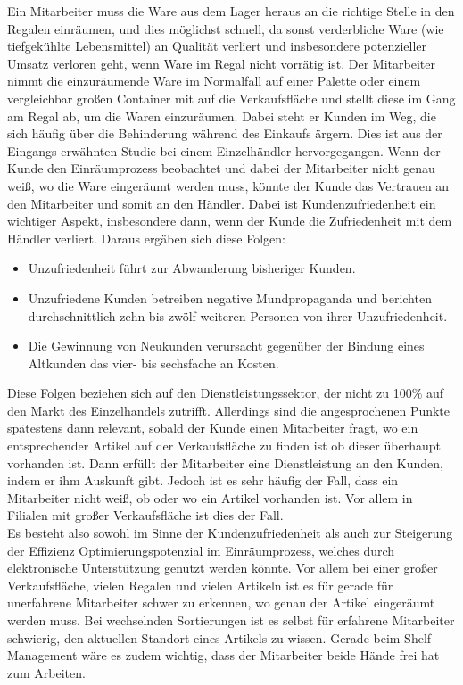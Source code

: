 Ein Mitarbeiter muss die Ware aus dem Lager heraus an die richtige Stelle in den Regalen einräumen, und dies möglichst schnell, da sonst verderbliche Ware (wie \zB tiefgekühlte Lebensmittel) an Qualität verliert und insbesondere potenzieller Umsatz verloren geht, wenn Ware im Regal nicht vorrätig ist. Der Mitarbeiter nimmt die einzuräumende Ware im Normalfall auf einer Palette oder einem vergleichbar großen Container mit auf die Verkaufsfläche und stellt diese im Gang am Regal ab, um die Waren einzuräumen. Dabei steht er Kunden im Weg, die sich häufig über die Behinderung während des Einkaufs ärgern. Dies ist aus der Eingangs erwähnten Studie bei einem Einzelhändler hervorgegangen. Wenn der Kunde den Einräumprozess beobachtet und dabei der Mitarbeiter nicht genau weiß, wo die Ware eingeräumt werden muss, könnte der Kunde das Vertrauen an den Mitarbeiter und somit an den Händler. Dabei ist Kundenzufriedenheit ein wichtiger Aspekt, insbesondere dann, wenn der Kunde die Zufriedenheit mit dem Händler verliert. Daraus ergäben sich diese Folgen:
\begin{itemize}
	\item Unzufriedenheit führt zur Abwanderung bisheriger Kunden.
	\item Unzufriedene Kunden betreiben negative Mundpropaganda und berichten durchschnittlich zehn bis zwölf weiteren Personen von ihrer Unzufriedenheit.
	\item Die Gewinnung von Neukunden verursacht gegenüber der Bindung eines Altkunden das vier- bis sechsfache an Kosten.
\end{itemize}
Diese Folgen beziehen sich auf den Dienstleistungssektor, der nicht zu 100\% auf den Markt des Einzelhandels zutrifft. Allerdings sind die angesprochenen Punkte spätestens dann relevant, sobald der Kunde einen Mitarbeiter fragt, wo ein entsprechender Artikel auf der Verkaufsfläche zu finden ist \bzw ob dieser überhaupt vorhanden ist. Dann erfüllt der Mitarbeiter eine Dienstleistung an den Kunden, indem er ihm Auskunft gibt. Jedoch ist es sehr häufig der Fall, dass ein Mitarbeiter nicht weiß, ob oder wo ein Artikel vorhanden ist. Vor allem in Filialen mit großer Verkaufsfläche ist dies der Fall.\\

Es besteht also sowohl im Sinne der Kundenzufriedenheit als auch zur Steigerung der Effizienz Optimierungspotenzial im Einräumprozess, welches durch elektronische Unterstützung genutzt werden könnte. Vor allem bei einer großer Verkaufsfläche, vielen Regalen und vielen Artikeln ist es für gerade für unerfahrene Mitarbeiter schwer zu erkennen, wo genau der Artikel eingeräumt werden muss. Bei wechselnden Sortierungen ist es selbst für erfahrene Mitarbeiter schwierig, den aktuellen Standort eines Artikels zu wissen. Gerade beim Shelf-Management wäre es zudem wichtig, dass der Mitarbeiter beide Hände frei hat zum Arbeiten.

